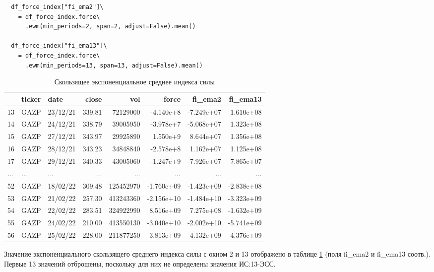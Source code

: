 \documentclass[14pt,a4paper]{extarticle}%
\begin{document}
\begin{lstlisting}
  df_force_index["fi_ema2"]\
    = df_force_index.force\
      .ewm(min_periods=2, span=2, adjust=False).mean()

  df_force_index["fi_ema13"]\
    = df_force_index.force\
      .ewm(min_periods=13, span=13, adjust=False).mean()
\end{lstlisting}

\begin{table}[H]
  \centering
  \begin{tabular}{lllrrrrr}
    \toprule
    {} & ticker &      date &   close &       vol &        force &       fi\_ema2 &      fi\_ema13 \\
    \midrule
    13 &   GAZP &  23/12/21 &  339.81 &  72129000 & -4.140e+8 & -7.249e+07 &  1.610e+08 \\
    14 &   GAZP &  24/12/21 &  338.79 &  39005950 & -3.978e+7 & -5.068e+07 &  1.323e+08 \\
    15 &   GAZP &  27/12/21 &  343.97 &  29925890 &  1.550e+9 &  8.644e+07 &  1.356e+08 \\
    16 &   GAZP &  28/12/21 &  343.23 &  34848840 & -2.578e+8 &  1.162e+07 &  1.125e+08 \\
    17 &   GAZP &  29/12/21 &  340.33 &  43005060 & -1.247e+9 & -7.926e+07 &  7.865e+07 \\
    ... &   ... &  ... &  ... &  ... & ... & ... &  ... \\
    52 &   GAZP &  18/02/22 &  309.48 &  125452970 & -1.760e+09 & -1.423e+09 & -2.838e+08 \\
    53 &   GAZP &  21/02/22 &  257.30 &  413243360 & -2.156e+10 & -1.484e+10 & -3.323e+09 \\
    54 &   GAZP &  22/02/22 &  283.51 &  324922990 &  8.516e+09 &  7.275e+08 & -1.632e+09 \\
    55 &   GAZP &  24/02/22 &  210.00 &  413550130 & -3.040e+10 & -2.002e+10 & -5.741e+09 \\
    56 &   GAZP &  25/02/22 &  228.00 &  211877250 &  3.813e+09 & -4.132e+09 & -4.376e+09 \\
    \bottomrule
    \end{tabular}
  \caption{Скользящее экспоненциальное среднее индекса силы}
  \label{table:data_per_day_FI_EMA}
\end{table}

\vspace{.5cm}

Значение экспоненциального скользящего среднего индекса силы с окном 2 и 13
отображено в таблице \ref{table:data_per_day_FI_EMA} (поля fi\_ema2 и fi\_ema13 соотв.).
Первые 13 значений отброшены, поскольку для них не определены значения ИС:13-ЭСС.
\end{document}
